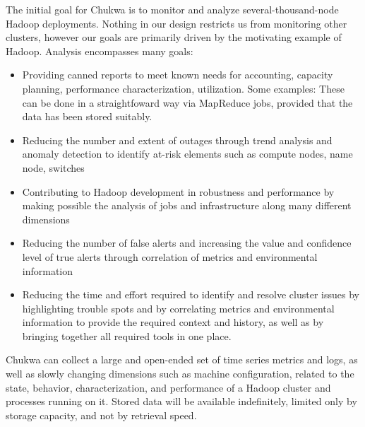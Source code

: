 \documentclass[letterpaper,twocolumn,10pt]{article}
\begin{document}
The initial goal for Chukwa is to monitor and analyze several-thousand-node Hadoop deployments. Nothing in our design restricts us from monitoring other clusters, however our goals are primarily driven by the motivating example of Hadoop.  Analysis encompasses many goals:  
\begin{itemize}
\item
Providing canned reports to meet known needs for accounting, capacity planning, performance characterization, utilization.  Some examples:
These can be done in a straightfoward way via MapReduce jobs, provided that the data has been stored suitably.  
\item
 Reducing the number and extent of outages through trend analysis and anomaly detection to identify at-risk elements such as compute nodes, name node, switches 
\item
  Contributing to Hadoop development in robustness and performance by making possible the analysis of jobs and infrastructure along many different dimensions
\item
   Reducing the number of false alerts and increasing the value and confidence level of true alerts through correlation of metrics and environmental information
\item
    Reducing the time and effort required to identify and resolve cluster issues by highlighting trouble spots and by correlating metrics and environmental information to provide the required context and history, as well as by bringing together all required tools in one place.
\end{itemize}

Chukwa can collect a large and open-ended set of time series metrics and logs, as well as  slowly changing dimensions such as machine configuration, related to the state, behavior, characterization, and performance of a Hadoop cluster and processes running on it. Stored data will be available indefinitely, limited only by storage capacity, and not by retrieval speed.  

\end{document}
